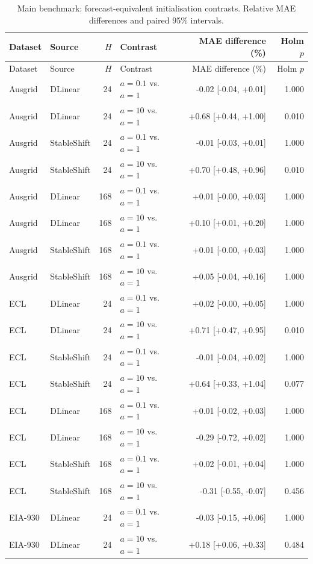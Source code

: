 \begin{longtable}{llrlrr}
\caption{Main benchmark: forecast-equivalent initialisation contrasts. Relative MAE differences and paired 95\% intervals.}\label{tab:test_coordinate}\\
\toprule
Dataset & Source & $H$ & Contrast & MAE difference (\%) & Holm $p$\\
\midrule
\endfirsthead
\toprule
Dataset & Source & $H$ & Contrast & MAE difference (\%) & Holm $p$\\
\midrule
\endhead
Ausgrid & DLinear & 24 & $a=0.1$ vs. $a=1$ & -0.02 [-0.04, +0.01] & 1.000\\
Ausgrid & DLinear & 24 & $a=10$ vs. $a=1$ & +0.68 [+0.44, +1.00] & 0.010\\
Ausgrid & StableShift & 24 & $a=0.1$ vs. $a=1$ & -0.01 [-0.03, +0.01] & 1.000\\
Ausgrid & StableShift & 24 & $a=10$ vs. $a=1$ & +0.70 [+0.48, +0.96] & 0.010\\
Ausgrid & DLinear & 168 & $a=0.1$ vs. $a=1$ & +0.01 [-0.00, +0.03] & 1.000\\
Ausgrid & DLinear & 168 & $a=10$ vs. $a=1$ & +0.10 [+0.01, +0.20] & 1.000\\
Ausgrid & StableShift & 168 & $a=0.1$ vs. $a=1$ & +0.01 [-0.00, +0.03] & 1.000\\
Ausgrid & StableShift & 168 & $a=10$ vs. $a=1$ & +0.05 [-0.04, +0.16] & 1.000\\
ECL & DLinear & 24 & $a=0.1$ vs. $a=1$ & +0.02 [-0.00, +0.05] & 1.000\\
ECL & DLinear & 24 & $a=10$ vs. $a=1$ & +0.71 [+0.47, +0.95] & 0.010\\
ECL & StableShift & 24 & $a=0.1$ vs. $a=1$ & -0.01 [-0.04, +0.02] & 1.000\\
ECL & StableShift & 24 & $a=10$ vs. $a=1$ & +0.64 [+0.33, +1.04] & 0.077\\
ECL & DLinear & 168 & $a=0.1$ vs. $a=1$ & +0.01 [-0.02, +0.03] & 1.000\\
ECL & DLinear & 168 & $a=10$ vs. $a=1$ & -0.29 [-0.72, +0.02] & 1.000\\
ECL & StableShift & 168 & $a=0.1$ vs. $a=1$ & +0.02 [-0.01, +0.04] & 1.000\\
ECL & StableShift & 168 & $a=10$ vs. $a=1$ & -0.31 [-0.55, -0.07] & 0.456\\
EIA-930 & DLinear & 24 & $a=0.1$ vs. $a=1$ & -0.03 [-0.15, +0.06] & 1.000\\
EIA-930 & DLinear & 24 & $a=10$ vs. $a=1$ & +0.18 [+0.06, +0.33] & 0.484\\

\end{longtable}

